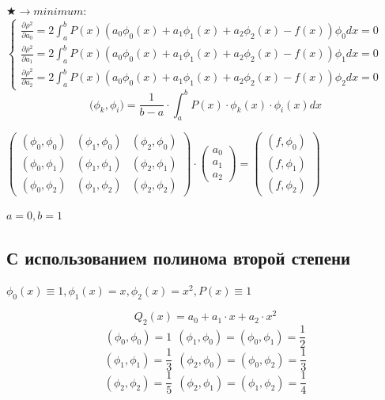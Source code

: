 $\bigstar \rightarrow minimum :$\\[1mm]

$
 \begin{cases}
  \frac{\partial \rho^2}{\partial a_0} = 2 \int_a^b P(x) (a_0 \phi_0(x) + a_1 \phi_1(x) + a_2 \phi_2(x) - f(x)) \phi_0 dx = 0
   \\[2mm]
  \frac{\partial \rho^2}{\partial a_1} = 2 \int_a^b P(x) (a_0 \phi_0(x) + a_1 \phi_1(x) + a_2 \phi_2(x) - f(x)) \phi_1 dx = 0
   \\[2mm]
  \frac{\partial \rho^2}{\partial a_2} = 2 \int_a^b P(x) (a_0 \phi_0(x) + a_1 \phi_1(x) + a_2 \phi_2(x) - f(x)) \phi_2 dx = 0
 \end{cases}
$\\[1mm]

\begin{displaymath}
\Big (\phi_k, \phi_i \Big ) = \frac{1}{b - a} \cdot \int_a^b P(x) \cdot \phi_k(x) \cdot \phi_i(x)dx
\end{displaymath}

$
\begin{pmatrix}
(\phi_0, \phi_0) & (\phi_1, \phi_0) & (\phi_2, \phi_0)
\\
(\phi_0, \phi_1) & (\phi_1, \phi_1) & (\phi_2, \phi_1)
\\
(\phi_0, \phi_2) & (\phi_1, \phi_2) & (\phi_2, \phi_2)
\end{pmatrix}
\cdot
\begin{pmatrix}
a_0
\\
a_1
\\
a_2
\end{pmatrix}
=
\begin{pmatrix}
(f, \phi_0)
\\
(f, \phi_1)
\\
(f, \phi_2)
\end{pmatrix}
$


$a = 0, b = 1$

\subsection{С использованием полинома второй степени}

$\phi_0(x) \equiv 1, \phi_1(x) = x, \phi_2(x) = x^2, P(x) \equiv 1$

\begin{displaymath}
Q_2(x) = a_0 + a_1 \cdot x + a_2 \cdot x^2
\end{displaymath}
\begin{displaymath}
(\phi_0, \phi_0) = 1 \ \ (\phi_1, \phi_0) = (\phi_0, \phi_1) = \frac{1}{2}
\end{displaymath}
\begin{displaymath}
(\phi_1, \phi_1) = \frac{1}{3} \ \ (\phi_2, \phi_0) = (\phi_0, \phi_2) = \frac{1}{3}
\end{displaymath}
\begin{displaymath}
(\phi_2, \phi_2) = \frac{1}{5} \ \ (\phi_2, \phi_1) = (\phi_1, \phi_2) = \frac{1}{4}
\end{displaymath}

